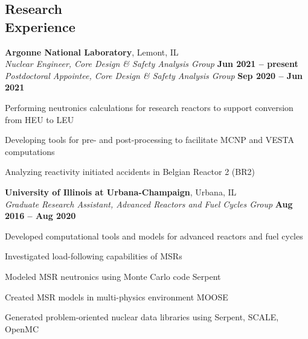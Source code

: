 \documentclass[margin,line]{resume}
\begin{document}
\begin{resume}
    \section{\mysidestyle Research\\Experience}               
    \textbf{Argonne National Laboratory}, Lemont, IL\\
		\textsl{Nuclear Engineer, Core Design \& Safety Analysis Group} 
		\hfill \textbf{Jun 2021 -- present}\\		
		\textsl{Postdoctoral Appointee, Core Design \& Safety Analysis Group} 
		\hfill \textbf{Sep 2020 -- Jun 2021}\\
\vspace{-4mm}\begin{list2}
	\item Performing neutronics calculations for research reactors to 
	support conversion from HEU to LEU
	\item Developing tools for pre- and post-processing 
	to facilitate MCNP and VESTA computations
	\item Analyzing reactivity initiated accidents in Belgian Reactor 2 (BR2)
\end{list2}

    \textbf{University of Illinois at Urbana-Champaign}, Urbana, IL\\
		\textsl{Graduate Research Assistant, Advanced Reactors and Fuel Cycles 
		Group} \hfill \textbf{Aug 2016 -- Aug 2020}\\
                \vspace{-4mm}\begin{list2}
                \item Developed computational tools and models for advanced 
                reactors and fuel cycles
                \item Investigated load-following capabilities of MSRs
                \item Modeled MSR neutronics using Monte Carlo code 
                Serpent
				\item Created MSR models in multi-physics environment MOOSE
				\item Generated problem-oriented nuclear data libraries using 
				Serpent, SCALE, OpenMC
                \end{list2}


\end{resume}
\end{document}
